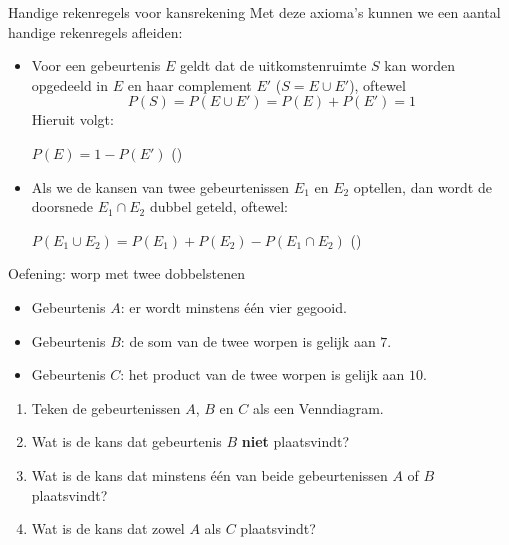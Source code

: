 \begin{frame}{Handige rekenregels voor kansrekening}
    Met deze axioma's kunnen we een aantal handige rekenregels afleiden:
    \begin{itemize}\setlength\itemsep{3em}
        \item Voor een gebeurtenis $E$ geldt dat de uitkomstenruimte $S$ kan worden opgedeeld in $E$ en haar complement $E'$ ($S = E \cup E'$), oftewel 
        \[
            P(S) = P(E \cup E') = P(E) + P(E') = 1
        \]
        Hieruit volgt:\bigskip
        
        $P(E) = 1 - P(E')$ \hfill ()
        
        \item Als we de kansen van twee gebeurtenissen $E_1$ en $E_2$ optellen, dan wordt de doorsnede $E_1 \cap E_2$ dubbel geteld, oftewel:\bigskip
        
        $P(E_1 \cup E_2) = P(E_1) + P(E_2) - P(E_1 \cap E_2)$ \hfill ()
    \end{itemize}
\end{frame}

\begin{frame}{Oefening: worp met twee dobbelstenen}
    \begin{itemize}
        \item Gebeurtenis $A$: er wordt minstens één vier gegooid.
        \item Gebeurtenis $B$: de som van de twee worpen is gelijk aan $7$.
        \item Gebeurtenis $C$: het product van de twee worpen is gelijk aan $10$.
    \end{itemize}
    \vfill
    \begin{enumerate}\setlength\itemsep{2em}
        \item Teken de gebeurtenissen $A$, $B$ en $C$ als een Venndiagram.
        \item Wat is de kans dat gebeurtenis $B$ \textbf{niet} plaatsvindt?
        \item Wat is de kans dat minstens één van beide gebeurtenissen $A$ of $B$ plaatsvindt?
        \item Wat is de kans dat zowel $A$ als $C$ plaatsvindt?
    \end{enumerate}
\end{frame}


